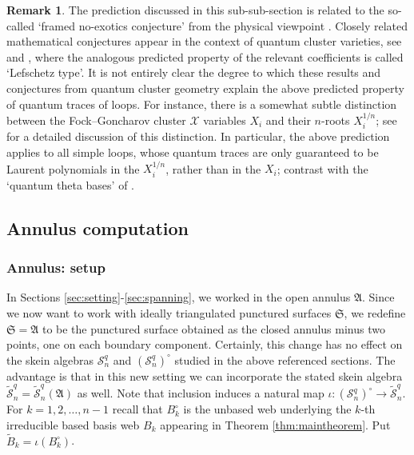 \documentclass[12pt,
	]{amsart}
\theoremstyle{definition}
\newtheorem{remark}[theorem]{Remark}
\renewcommand{\tilde}{\widetilde}
\newcommand{\mcal}[1]{\mathcal{#1}}
\newcommand{\mfrak}[1]{\mathfrak{#1}}
\newcommand{\lp}{\left(}\newcommand{\rp}{\right)}
\newcommand{\unbased}[1]{#1^\circ}
\newcommand{\sk}{\mcal{S}_n^q}
\newcommand{\usk}{\unbased{\lp\sk\rp}}
\newcommand{\ann}{\mfrak{A}}
\newcommand{\surf}{\mfrak{S}}
\newcommand{\ssk}{\tilde{\mcal{S}}_n^q}
\newcommand{\incl}{\iota}
\begin{document}
\begin{remark}
The prediction discussed in this sub-sub-section is related to the so-called `framed no-exotics conjecture' from the physical viewpoint \cite{gabellaMR3613514, gaiottoMR3250763, neitzkeMR4190271}.  Closely related mathematical conjectures appear in the context of quantum cluster varieties, see \cite{davisonMR3739230} and \cite[Conjecture 1.4]{davisonMR4337972}, where the analogous predicted property of the relevant coefficients is called `Lefschetz type'.  It is not entirely clear the degree to which these results and conjectures from quantum cluster geometry explain the above predicted property of quantum traces of loops.  For instance, there is a somewhat subtle distinction between the Fock--Goncharov cluster $\mcal{X}$ variables $X_{i}$ and their $n$-roots $X_i^{1/n}$; see \cite{kim2022rm, Kim_2024} for a detailed discussion of this distinction.  In particular, the above prediction applies to all simple loops, whose quantum traces are only guaranteed to be Laurent polynomials in the $X_i^{1/n}$, rather than in the $X_i$; contrast with the `quantum theta bases' of \cite{allegrettiMR3581328, mandel2023bracelets}.  
\end{remark}

\subsection{Annulus computation}\label{ssec:annulus-computation}

\subsubsection{Annulus:  setup}\label{sssec:annuluscomputationsetup}

In Sections \ref{sec:setting}-\ref{sec:spanning}, we worked in the open annulus $\ann$.  Since we now want to work with ideally triangulated punctured surfaces $\surf$, we redefine $\surf=\ann$ to be the punctured surface obtained as the closed annulus minus two points, one on each boundary component.  Certainly, this change has no effect on the skein algebras $\sk$ and $\usk$ studied in the above referenced sections.  The advantage is that in this new setting we can  incorporate the stated skein algebra $\ssk=\ssk(\ann)$ as well.  Note that inclusion induces a natural map $\incl:\usk\to\ssk$.  For $k=1,2,\dots,n-1$ recall that $\unbased{B}_k$ is the unbased web underlying the $k$-th irreducible based basis web $B_k$ appearing in Theorem \ref{thm:maintheorem}.  Put $\tilde{B}_k=\incl(\unbased{B}_k)$.  
\end{document}
